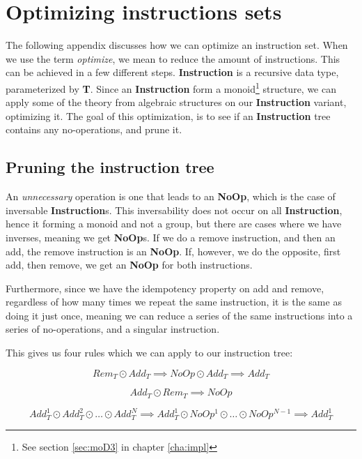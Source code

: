 \chapter{Optimizing instructions sets} \label{app:a}

The following appendix discusses how we can optimize an instruction set. When we
use the term \textit{optimize}, we mean to reduce the amount of instructions.
This can be achieved in a few different steps. \textbf{Instruction} is a
recursive data type, parameterized by \textbf{T}. Since an \textbf{Instruction}
form a monoid\footnote{See section \ref{sec:moD3} in chapter \ref{cha:impl}}
structure, we can apply some of the theory from algebraic structures on our
\textbf{Instruction} variant, optimizing it. The goal of this optimization, is
to see if an \textbf{Instruction} tree contains any no-operations, and prune it.


\section{Pruning the instruction tree}

An \textit{unnecessary} operation is one that leads to an \textbf{NoOp}, which
is the case of inversable \textbf{Instruction}s. This inversability does not
occur on all \textbf{Instruction}, hence it forming a monoid and not a group,
but there are cases where we have inverses, meaning we get \textbf{NoOp}s. If we
do a remove instruction, and then an add, the remove instruction is an
\textbf{NoOp}. If, however, we do the opposite, first add, then remove, we get
an \textbf{NoOp} for both instructions.

Furthermore, since we have the idempotency property on add and remove,
regardless of how many times we repeat the same instruction, it is the same as
doing it just once, meaning we can reduce a series of the same instructions into
a series of no-operations, and a singular instruction.

This gives us four rules which we can apply to our instruction tree:

\begin{equation} \label{eq:apx1}
  Rem_T \odot Add_T \implies NoOp \odot Add_T \implies Add_T
\end{equation}

\begin{equation} \label{eq:apx2}
  Add_T \odot Rem_T \implies NoOp
\end{equation}

\begin{equation} \label{eq:apx3}
  Add_T^1 \odot Add_T^2 \odot \dots \odot Add_T^N \implies Add_T^1 \odot NoOp^1 \odot \dots \odot NoOp^{N - 1} \implies Add_T^1
\end{equation}


